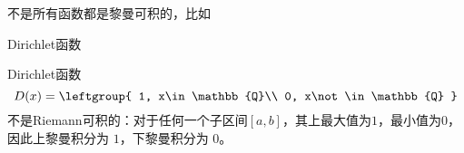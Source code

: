 


不是所有函数都是黎曼可积的，比如

\begin{example}{Dirichlet函数}

Dirichlet函数
\begin{equation}
D(x)=
\leftgroup{
    1, x\in\mathbb{Q}\\
    0, x\not\in\mathbb{Q}
}
\end{equation}
不是Riemann可积的：对于任何一个子区间$[a, b]$，其上最大值为$1$，最小值为$0$，因此上黎曼积分为 $1$，下黎曼积分为 $0$。
\end{example}
